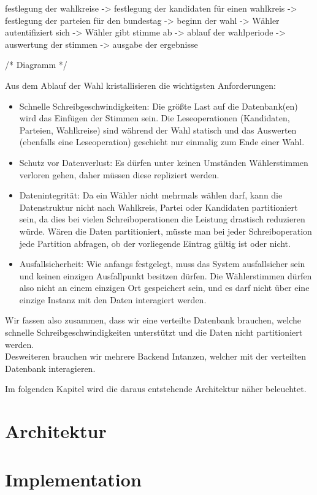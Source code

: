 \documentclass{article}  %
\begin{document}
festlegung der wahlkreise -> festlegung der kandidaten für einen wahlkreis -> festlegung der parteien für den bundestag -> beginn der wahl -> Wähler autentifiziert sich -> Wähler gibt stimme ab -> ablauf der wahlperiode -> auswertung der stimmen -> ausgabe der ergebnisse

/* Diagramm */ 

Aus dem Ablauf der Wahl kristallisieren die wichtigsten Anforderungen: \\
\begin{itemize}
    \item Schnelle Schreibgeschwindigkeiten: Die größte Last auf die Datenbank(en) wird das Einfügen der Stimmen sein. Die Leseoperationen (Kandidaten, Parteien, Wahlkreise) sind während der Wahl statisch und das Auswerten (ebenfalls eine Leseoperation) geschieht nur einmalig zum Ende einer Wahl. 

    \item Schutz vor Datenverlust: Es dürfen unter keinen Umständen Wählerstimmen verloren gehen, daher müssen diese repliziert werden.

    \item Datenintegrität: Da ein Wähler nicht mehrmals wählen darf, kann die Datenstruktur nicht nach Wahlkreis, Partei oder Kandidaten partitioniert sein, da dies bei vielen Schreiboperationen die Leistung drastisch reduzieren würde. Wären die Daten partitioniert, müsste man bei jeder Schreiboperation jede Partition abfragen, ob der vorliegende Eintrag gültig ist oder nicht.

    \item Ausfallsicherheit: Wie anfangs festgelegt, muss das System ausfallsicher sein und keinen einzigen Ausfallpunkt besitzen dürfen. Die Wählerstimmen dürfen also nicht an einem einzigen Ort gespeichert sein, und es darf nicht über eine einzige Instanz mit den Daten interagiert werden.
\end{itemize} 

Wir fassen also zusammen, dass wir eine verteilte Datenbank brauchen, welche schnelle Schreibgeschwindigkeiten unterstützt und die Daten nicht partitioniert werden. \\
Desweiteren brauchen wir mehrere Backend Intanzen, welcher mit der verteilten Datenbank interagieren.

Im folgenden Kapitel wird die daraus entstehende Architektur näher beleuchtet.

\section{Architektur}
\newpage
\section{Implementation}
\newpage
\end{document}
